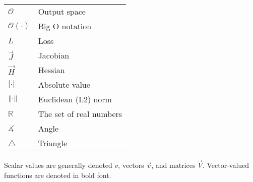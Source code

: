 \begin{table}[h!]
\begin{tabular}{l|l}
        $\mathcal{O}$ & Output space \\
        $\mathcal{O}(\cdot)$ & Big O notation \\
        $L$ & Loss \\
        $\vec{J}$ & Jacobian \\
        $\vec{H}$ & Hessian \\
        $|\cdot|$ & Absolute value \\
        $\left\lVert\cdot\right\rVert$ & Euclidean (L2) norm \\
        $\mathbb{R}$ & The set of real numbers \\
        $\measuredangle$ & Angle \\
        $\triangle$ & Triangle
    \end{tabular}
\end{table}

\noindent
Scalar values are generally denoted $v$, vectors $\vec{v}$, and matrices $\vec{V}$.
Vector-valued functions are denoted in bold font.